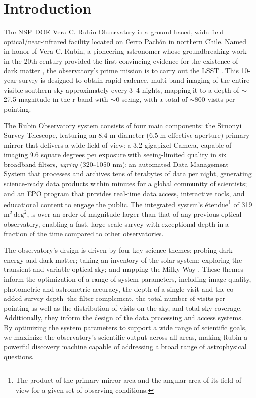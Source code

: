 \section{Introduction}
\label{sec:intro}
The \gls{NSF}–\gls{DOE} Vera C. Rubin Observatory is a ground-based, wide-field optical/near-infrared facility located on Cerro Pach\'on in northern Chile.
Named in honor of Vera C. Rubin, a pioneering astronomer whose groundbreaking work in the 20th century provided the first convincing evidence for the existence of dark matter \citep{1970ApJ...159..379R, 1980ApJ...238..471R}, the observatory’s prime mission is to carry out the \gls{LSST} \citep{2019ApJ...873..111I}.
This 10-year survey is designed to obtain rapid-\gls{cadence}, multi-band imaging of the entire visible southern sky approximately every 3–4 nights, mapping it to a depth of $\sim$27.5 magnitude in the r-band with $\sim$0 \gls{seeing}, with a total of $\sim$800 visits per pointing.

The Rubin Observatory system consists of four main components: the \gls{Simonyi Survey Telescope}, featuring an 8.4 m diameter (6.5 m effective aperture) primary mirror that delivers a wide field of view; a 3.2-gigapixel Camera, capable of imaging 9.6 square degrees per exposure with seeing-limited quality in six broadband filters, \textit{ugrizy} (320–1050 nm); an automated \gls{Data Management System} that processes and archives tens of terabytes of data per night, generating science-ready data products within minutes for a global community of scientists; and an \gls{EPO} program that provides real-time data access, interactive tools, and educational content to engage the public.
The integrated system's \'etendue\footnote{The product of the primary mirror area and the angular area of its field of view for a given set of observing conditions.} of 319 $\text{m}^2 \,\text{deg}^2$, is over an order of magnitude larger than that of any previous optical observatory, enabling a fast, large-scale survey with exceptional depth in a fraction of the time compared to other observatories.

The observatory's design is driven by four key science themes: probing dark energy and dark matter; taking an inventory of the solar system; exploring the transient and variable optical sky; and mapping the Milky Way \citep{2019ApJ...873..111I}.
These themes inform the optimization of a range of system parameters, including image quality, photometric and astrometric accuracy, the depth of a single visit and the co-added survey depth, the filter complement, the total number of visits per pointing as well as the distribution of visits on the sky, and  total sky coverage.
Additionally, they inform the design of the data processing and access systems.
By optimizing the system parameters to support a wide range of scientific goals, we maximize the observatory's scientific output across all areas, making Rubin a powerful discovery machine capable of addressing a broad range of astrophysical questions.


